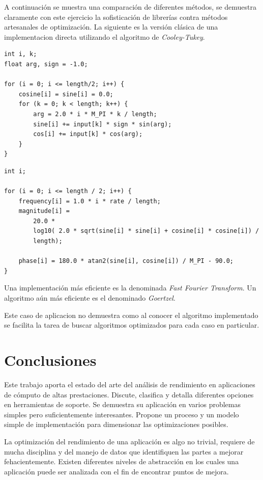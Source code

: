 \documentclass[a4paper]{report}
\begin{document}
\bigskip

A continuaci\'on se muestra una comparaci\'on de diferentes m\'etodos, se
demuestra claramente con este ejercicio la sofisticaci\'on de librer\'ias
contra m\'etodos artesanales de optimizaci\'on. La siguiente es la versi\'on
cl\'asica de una implementacion directa utilizando el algoritmo de
{\it Cooley-Tukey}.

\begin{verbatim}
int i, k;
float arg, sign = -1.0;

for (i = 0; i <= length/2; i++) {
    cosine[i] = sine[i] = 0.0;
    for (k = 0; k < length; k++) {
        arg = 2.0 * i * M_PI * k / length;
        sine[i] += input[k] * sign * sin(arg);
        cos[i] += input[k] * cos(arg);
    }
}
\end{verbatim}

\begin{verbatim}
int i;

for (i = 0; i <= length / 2; i++) {
    frequency[i] = 1.0 * i * rate / length;
    magnitude[i] =
        20.0 *
        log10( 2.0 * sqrt(sine[i] * sine[i] + cosine[i] * cosine[i]) /
        length);

    phase[i] = 180.0 * atan2(sine[i], cosine[i]) / M_PI - 90.0;
}
\end{verbatim}

Una implementaci\'on m\'as eficiente es la denominada {\it Fast Fourier Transform}.
Un algoritmo a\'un m\'as eficiente es el denominado {\it Goertzel}.

\bigskip

Este caso de aplicacion no demuestra como al conocer el algoritmo implementado se
facilita la tarea de buscar algoritmos optimizados para cada caso en particular.

\chapter{Conclusiones}

Este trabajo aporta el estado del arte del an\'alisis de rendimiento en
aplicaciones de c\'omputo de altas prestaciones. Discute, clasifica y detalla
diferentes opciones en herramientas de soporte. Se demuestra su aplicaci\'on
en varios problemas simples pero suficientemente interesantes. Propone un
proceso y un modelo simple de implementaci\'on para dimensionar las
optimizaciones posibles.

\bigskip

La optimizaci\'on del rendimiento de una aplicaci\'on es algo no trivial, requiere de mucha
disciplina y del manejo de datos que identifiquen las partes a mejorar fehacientemente.
Existen diferentes niveles de abstracci\'on en los cuales una aplicaci\'on puede ser analizada con el fin
de encontrar puntos de mejora. 
\end{document}
